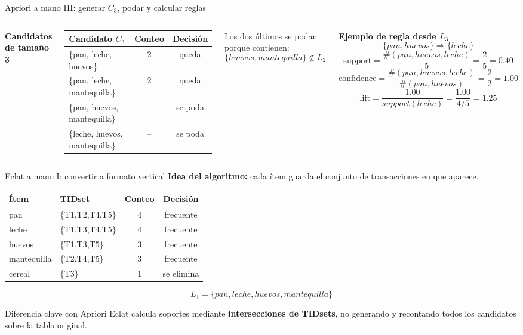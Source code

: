 \documentclass[10pt,aspectratio=169]{beamer}
\begin{document}
\begin{frame}{Apriori a mano III: generar $C_3$, podar y calcular reglas}
\scriptsize
\begin{columns}[T]
\textbf{Candidatos de tamaño 3}
\begin{table}
\centering
\begin{tabular}{lcc}
\toprule
Candidato $C_3$ & Conteo & Decisión \\
\midrule
\{pan, leche, huevos\} & 2 & queda \\
\{pan, leche, mantequilla\} & 2 & queda \\
\{pan, huevos, mantequilla\} & -- & se poda \\
\{leche, huevos, mantequilla\} & -- & se poda \\
\bottomrule
\end{tabular}
\end{table}

Los dos últimos se podan porque contienen:
\[
\{huevos,mantequilla\}\notin L_2
\]

\textbf{Ejemplo de regla desde $L_3$}
\[
\{pan,huevos\}\Rightarrow\{leche\}
\]
\[
\text{support}=\frac{\#(pan,huevos,leche)}{5}=\frac{2}{5}=0.40
\]
\[
\text{confidence}=\frac{\#(pan,huevos,leche)}{\#(pan,huevos)}=\frac{2}{2}=1.00
\]
\[
\text{lift}=\frac{1.00}{support(leche)}=\frac{1.00}{4/5}=1.25
\]
\end{columns}
\end{frame}

\begin{frame}{Eclat a mano I: convertir a formato vertical}
\scriptsize
\textbf{Idea del algoritmo:} cada ítem guarda el conjunto de transacciones en que aparece.

\begin{table}
\centering
\begin{tabular}{llcc}
\toprule
Ítem & TIDset & Conteo & Decisión \\
\midrule
pan & \{T1,T2,T4,T5\} & 4 & frecuente \\
leche & \{T1,T3,T4,T5\} & 4 & frecuente \\
huevos & \{T1,T3,T5\} & 3 & frecuente \\
mantequilla & \{T2,T4,T5\} & 3 & frecuente \\
cereal & \{T3\} & 1 & se elimina \\
\bottomrule
\end{tabular}
\end{table}

\[
L_1=\{pan, leche, huevos, mantequilla\}
\]
\begin{block}{Diferencia clave con Apriori}
Eclat calcula soportes mediante \textbf{intersecciones de TIDsets}, no generando y recontando todos los candidatos sobre la tabla original.
\end{block}
\end{frame}
\end{document}
